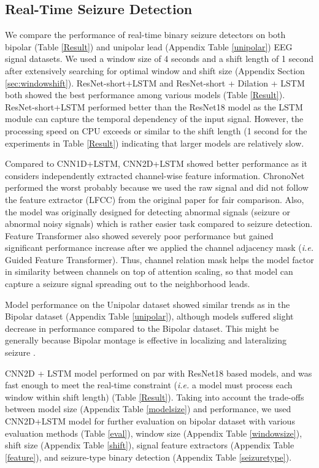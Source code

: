 \documentclass[pmlr,twocolumn,10pt]{jmlr}
\begin{document}
\subsection{Real-Time Seizure Detection}
\label{sec:results-realtime}
We compare the performance of real-time binary seizure detectors on both bipolar (Table \ref{Result}) and unipolar lead (Appendix Table \ref{unipolar}) EEG signal datasets. We used a window size of 4 seconds and a shift length of 1 second after extensively searching for optimal window and shift size (Appendix Section \ref{sec:windowshift}).
ResNet-short+LSTM and ResNet-short + Dilation + LSTM both showed the best performance among various models (Table \ref{Result}). 
ResNet-short+LSTM performed better than the ResNet18 model as the LSTM module can capture the temporal dependency of the input signal.
However, the processing speed on CPU exceeds or similar to the shift length (1 second for the experiments in Table \ref{Result}) indicating that larger models are relatively slow. 

Compared to CNN1D+LSTM, CNN2D+LSTM showed better performance as it considers independently extracted channel-wise feature information.
ChronoNet \citep{roy2019chrononet} performed the worst probably because we used the raw signal and did not follow the feature extractor (LFCC) from the original paper for fair comparison. Also, the model was originally designed for detecting abnormal signals (seizure or abnormal noisy signals) which is rather easier task compared to seizure detection.
Feature Transformer also showed severely poor performance but gained significant performance increase after we applied the channel adjacency mask (\textit{i.e.} Guided Feature Transformer).
Thus, channel relation mask helps the model factor in similarity between channels on top of attention scaling, so that model can capture a seizure signal spreading out to the neighborhood leads.

Model performance on the Unipolar dataset showed similar trends as in the Bipolar dataset (Appendix Table \ref{unipolar}), although models suffered slight decrease in performance compared to the Bipolar dataset.
This might be generally because Bipolar montage is effective in localizing and lateralizing seizure \citep{beniczky2020electroencephalography}. 

CNN2D + LSTM model performed on par with ResNet18 based models, and was fast enough to meet the real-time constraint (\textit{i.e.} a model must process each window within shift length) (Table \ref{Result}). Taking into account the trade-offs between model size (Appendix Table \ref{modelsize}) and performance, we used CNN2D+LSTM model for further evaluation on bipolar dataset with various evaluation methods (Table \ref{eval}), window size (Appendix Table \ref{windowsize}), shift size (Appendix Table \ref{shift}), signal feature extractors (Appendix Table \ref{feature}), and seizure-type binary detection (Appendix Table \ref{seizuretype}). 
\end{document}
